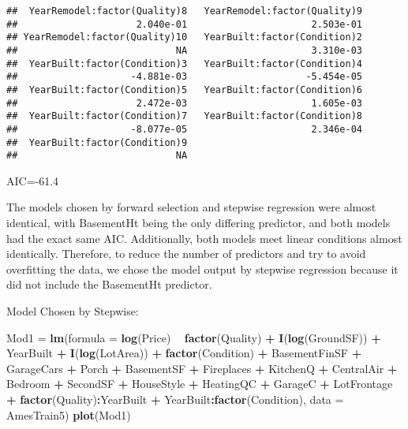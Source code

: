 \documentclass[
]{article}
\newenvironment{Shaded}{\begin{snugshade}}{\end{snugshade}}
\newcommand{\DataTypeTok}[1]{\textcolor[rgb]{0.13,0.29,0.53}{#1}}
\newcommand{\KeywordTok}[1]{\textcolor[rgb]{0.13,0.29,0.53}{\textbf{#1}}}
\newcommand{\NormalTok}[1]{#1}
\newcommand{\OperatorTok}[1]{\textcolor[rgb]{0.81,0.36,0.00}{\textbf{#1}}}
\newcommand{\StringTok}[1]{\textcolor[rgb]{0.31,0.60,0.02}{#1}}
\begin{document}
\begin{verbatim}
##  YearRemodel:factor(Quality)8   YearRemodel:factor(Quality)9  
##                     2.040e-01                      2.503e-01  
## YearRemodel:factor(Quality)10   YearBuilt:factor(Condition)2  
##                            NA                      3.310e-03  
##  YearBuilt:factor(Condition)3   YearBuilt:factor(Condition)4  
##                    -4.881e-03                     -5.454e-05  
##  YearBuilt:factor(Condition)5   YearBuilt:factor(Condition)6  
##                     2.472e-03                      1.605e-03  
##  YearBuilt:factor(Condition)7   YearBuilt:factor(Condition)8  
##                    -8.077e-05                      2.346e-04  
##  YearBuilt:factor(Condition)9  
##                            NA
\end{verbatim}

AIC=-61.4

The models chosen by forward selection and stepwise regression were
almost identical, with BasementHt being the only differing predictor,
and both models had the exact same AIC. Additionally, both models meet
linear conditions almost identically. Therefore, to reduce the number of
predictors and try to avoid overfitting the data, we chose the model
output by stepwise regression because it did not include the BasementHt
predictor.

Model Chosen by Stepwise:

\begin{Shaded}
\begin{Highlighting}[]
\NormalTok{Mod1 =}\StringTok{ }\KeywordTok{lm}\NormalTok{(}\DataTypeTok{formula =} \KeywordTok{log}\NormalTok{(Price) }\OperatorTok{~}\StringTok{ }\KeywordTok{factor}\NormalTok{(Quality) }\OperatorTok{+}\StringTok{ }\KeywordTok{I}\NormalTok{(}\KeywordTok{log}\NormalTok{(GroundSF)) }\OperatorTok{+}\StringTok{ }
\StringTok{    }\NormalTok{YearBuilt }\OperatorTok{+}\StringTok{ }\KeywordTok{I}\NormalTok{(}\KeywordTok{log}\NormalTok{(LotArea)) }\OperatorTok{+}\StringTok{ }\KeywordTok{factor}\NormalTok{(Condition) }\OperatorTok{+}\StringTok{ }\NormalTok{BasementFinSF }\OperatorTok{+}\StringTok{ }
\StringTok{    }\NormalTok{GarageCars }\OperatorTok{+}\StringTok{ }\NormalTok{Porch }\OperatorTok{+}\StringTok{ }\NormalTok{BasementSF }\OperatorTok{+}\StringTok{ }\NormalTok{Fireplaces }\OperatorTok{+}\StringTok{ }\NormalTok{KitchenQ }\OperatorTok{+}\StringTok{ }
\StringTok{    }\NormalTok{CentralAir }\OperatorTok{+}\StringTok{ }\NormalTok{Bedroom }\OperatorTok{+}\StringTok{ }\NormalTok{SecondSF }\OperatorTok{+}\StringTok{ }\NormalTok{HouseStyle }\OperatorTok{+}\StringTok{ }\NormalTok{HeatingQC }\OperatorTok{+}\StringTok{ }
\StringTok{    }\NormalTok{GarageC }\OperatorTok{+}\StringTok{ }\NormalTok{LotFrontage }\OperatorTok{+}\StringTok{ }\KeywordTok{factor}\NormalTok{(Quality)}\OperatorTok{:}\NormalTok{YearBuilt }\OperatorTok{+}\StringTok{ }\NormalTok{YearBuilt}\OperatorTok{:}\KeywordTok{factor}\NormalTok{(Condition), }
    \DataTypeTok{data =}\NormalTok{ AmesTrain5)}
\KeywordTok{plot}\NormalTok{(Mod1)}
\end{Highlighting}
\end{Shaded}
\end{document}
